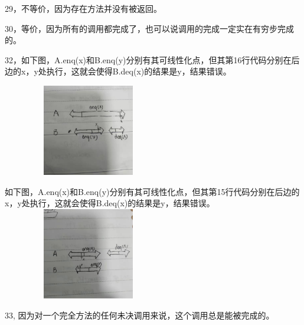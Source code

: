 \documentclass[UTF8]{ctexart}
\begin{document}
    29，不等价，因为存在方法并没有被返回。

    30，等价，因为所有的调用都完成了，也可以说调用的完成一定实在有穷步完成的。

    32，如下图，A.enq(x)和B.enq(y)分别有其可线性化点，但其第16行代码分别在后边的x，y处执行，这就会使得B.deq(x)的结果是y，结果错误。
    
    \centering
    \includegraphics[height=4.0cm,width=7.5cm]{./1.jpg}
    
    如下图，A.enq(x)和B.enq(y)分别有其可线性化点，但其第15行代码分别在后边的x，y处执行，这就会使得B.deq(x)的结果是y，结果错误。
    \includegraphics[height=4.0cm,width=7.5cm]{./2.jpg}
    
    33, 因为对一个完全方法的任何未决调用来说，这个调用总是能被完成的。
\end{document}
